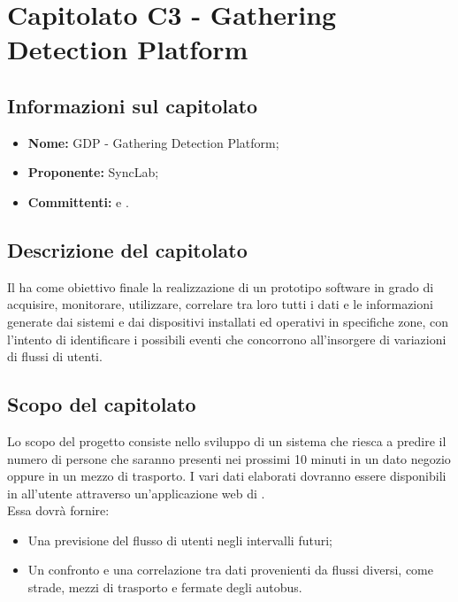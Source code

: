 \section{Capitolato C3 - Gathering Detection Platform}\label{C3}
\subsection{Informazioni sul capitolato}
\begin{itemize}
	\item \textbf{Nome:} GDP - Gathering Detection Platform;
	\item \textbf{Proponente:} SyncLab;
	\item \textbf{Committenti:} \VT{} e \CR{}.
\end{itemize}

\subsection{Descrizione del capitolato}
Il  ha come obiettivo finale la realizzazione di un prototipo software in grado di acquisire, monitorare, utilizzare, correlare tra loro tutti i dati e le informazioni generate dai sistemi e dai dispositivi installati ed operativi in specifiche zone, con l’intento di identificare i possibili eventi che concorrono all'insorgere di variazioni di flussi di utenti.

\subsection{Scopo del capitolato}
Lo scopo del progetto consiste nello sviluppo di un sistema che riesca a predire il numero di persone che saranno presenti nei prossimi 10 minuti in un dato negozio oppure in un mezzo di trasporto. I vari dati elaborati dovranno essere disponibili in  all'utente attraverso un'applicazione web di .\\
Essa dovrà fornire:
\begin{itemize}
	\item Una previsione del flusso di utenti negli intervalli futuri;
	\item Un confronto e una correlazione tra dati provenienti da flussi diversi, come strade, mezzi di trasporto e fermate degli autobus.
\end{itemize}

